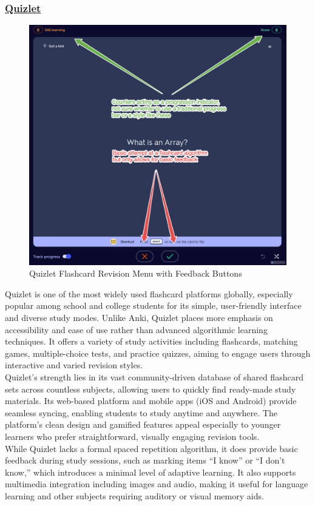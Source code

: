 \documentclass[a4paper,12pt]{article}
\begin{document}
\subsubsection{\underline{Quizlet}}
\begin{figure}[H]
    \centering
    \includegraphics[width=0.7\linewidth]{../Screenshots/QuizletSM2.png}
    \caption{Quizlet Flashcard Revision Menu with Feedback Buttons}
    \label{fig:quizlet-flashcard-menu}
\end{figure}

Quizlet is one of the most widely used flashcard platforms globally, especially popular among school and college students for its simple, user-friendly interface and diverse study modes. Unlike Anki, Quizlet places more emphasis on accessibility and ease of use rather than advanced algorithmic learning techniques. It offers a variety of study activities including flashcards, matching games, multiple-choice tests, and practice quizzes, aiming to engage users through interactive and varied revision styles.\\

Quizlet’s strength lies in its vast community-driven database of shared flashcard sets across countless subjects, allowing users to quickly find ready-made study materials. Its web-based platform and mobile apps (iOS and Android) provide seamless syncing, enabling students to study anytime and anywhere. The platform’s clean design and gamified features appeal especially to younger learners who prefer straightforward, visually engaging revision tools.\\

While Quizlet lacks a formal spaced repetition algorithm, it does provide basic feedback during study sessions, such as marking items “I know” or “I don’t know,” which introduces a minimal level of adaptive learning. It also supports multimedia integration including images and audio, making it useful for language learning and other subjects requiring auditory or visual memory aids.\\
\end{document}
